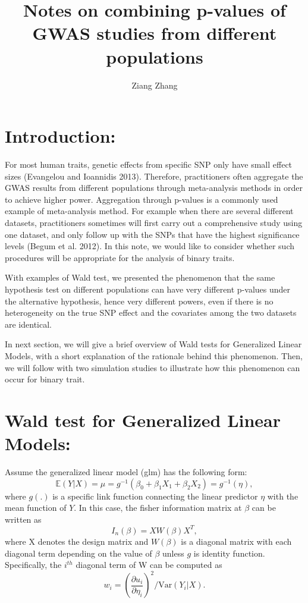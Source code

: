 \documentclass[
]{article}
\title{\textbf{Notes on combining p-values of GWAS studies from different
populations}}
\author{Ziang Zhang}
\date{}
\begin{document}
\maketitle

\newcommand{\p}{\text{P}}
\newcommand{\E}{\mathbb{E}}
\newcommand{\Var}{\text{Var}}

\hypertarget{introduction}{%
\section{Introduction:}\label{introduction}}

For most human traits, genetic effects from specific SNP only have small
effect sizes (Evangelou and Ioannidis 2013). Therefore, practitioners
often aggregate the GWAS results from different populations through
meta-analysis methods in order to achieve higher power. Aggregation
through p-values is a commonly used example of meta-analysis method. For
example when there are several different datasets, practitioners
sometimes will first carry out a comprehensive study using one dataset,
and only follow up with the SNPs that have the highest significance
levels (Begum et al. 2012). In this note, we would like to consider
whether such procedures will be appropriate for the analysis of binary
traits.

With examples of Wald test, we presented the phenomenon that the same
hypothesis test on different populations can have very different
p-values under the alternative hypothesis, hence very different powers,
even if there is no heterogeneity on the true SNP effect and the
covariates among the two datasets are identical.

In next section, we will give a brief overview of Wald tests for
Generalized Linear Models, with a short explanation of the rationale
behind this phenomenon. Then, we will follow with two simulation studies
to illustrate how this phenomenon can occur for binary trait.

\hypertarget{wald-test-for-generalized-linear-models}{%
\section{Wald test for Generalized Linear
Models:}\label{wald-test-for-generalized-linear-models}}

Assume the generalized linear model (glm) has the following form:
\[\mathbb{E}(Y|X) = \mu = g^{-1}(\beta_0 + \beta_1 X_1 + \beta_2X_2) = g^{-1}(\eta),\]
where \(g(.)\) is a specific link function connecting the linear
predictor \(\eta\) with the mean function of \(Y\). In this case, the
fisher information matrix at \(\beta\) can be written as
\[I_n(\beta) = XW(\beta) X^T,\] where X denotes the design matrix and
\(W(\beta)\) is a diagonal matrix with each diagonal term depending on
the value of \(\beta\) unless \(g\) is identity function. Specifically,
the \(i^{th}\) diagonal term of W can be computed as
\[w_i=(\frac{\partial u_i}{\partial\eta_i})^2/\text{Var}(Y_i|X).\]
\end{document}

